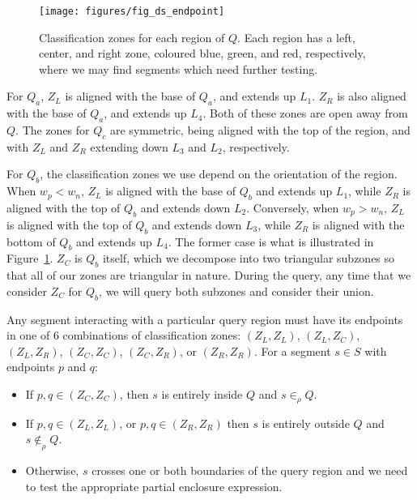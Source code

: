 \begin{figure}[t]
\begin{center}
  \texttt{[image: figures/fig\_ds\_endpoint]}
  \caption[Classification zones for $Q$.]{Classification zones for each region 
of $Q$. Each region has a left, center, and right zone, coloured blue, green, 
and red, respectively, where we may find segments which need further testing.}
  \label{fig:slabs:two:endpoint}
\end{center}
\end{figure}

For $Q_a$, $Z_L$ is aligned with the base of $Q_a$, and extends up $L_1$. 
$Z_R$ is also aligned with the base of $Q_a$, and extends up $L_4$.
Both of these zones are open away from $Q$.
The zones for $Q_c$ are symmetric, being aligned with the top of the region, and 
with $Z_L$ and $Z_R$ extending down $L_3$ and $L_2$, respectively.

For $Q_b$, the classification zones we use depend on the orientation of the 
region.
When $w_p < w_n$, $Z_L$ is aligned with the base of $Q_b$ and extends up $L_1$, 
while $Z_R$ is aligned with the top of $Q_b$ and extends down $L_2$.
Conversely, when $w_p > w_n$, $Z_L$ is aligned with the top of $Q_b$ and extends 
down $L_3$, while $Z_R$ is aligned with the bottom of $Q_b$ and extends up 
$L_4$.
The former case is what is illustrated in Figure~\ref{fig:slabs:two:endpoint}.
$Z_C$ is $Q_b$ itself, which we decompose into two triangular subzones so that 
all of our zones are triangular in nature.
During the query, any time that we consider $Z_C$ for $Q_b$, we will query both 
subzones and consider their union.

Any segment interacting with a particular query region must have its endpoints 
in one of 6 combinations of classification zones: $(Z_L, Z_L)$, $(Z_L, Z_C)$, 
$(Z_L, Z_R)$, $(Z_C,\allowbreak Z_C)$, $(Z_C, Z_R)$, or $(Z_R, Z_R)$. 
For a segment $s \in S$ with endpoints $p$ and $q$:
\begin{itemize}
\item If $p, q \in (Z_C, Z_C)$, then $s$ is entirely inside $Q$ and $s \in_\rho 
Q$.
\item If $p, q \in (Z_L, Z_L)$, or $p, q \in (Z_R, Z_R)$ then $s$ is entirely 
outside $Q$ and $s \not \in_\rho Q$.
\item Otherwise, $s$ crosses one or both boundaries of the query region and we 
need to test the appropriate partial enclosure expression.
\end{itemize}


